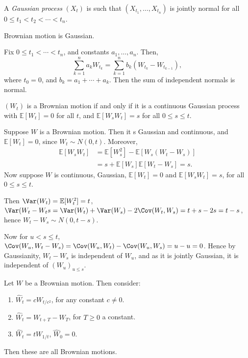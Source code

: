 \documentclass[12pt]{article}
\begin{document}
\begin{definition}
	A \emph{Gaussian process} $(X_t)$ is such that $(X_{t_1}, \ldots, X_{t_n})$ is jointly normal for all $0 \leq t_1 < t_2 < \cdots < t_n$.
\end{definition}

\begin{proposition}
	Brownian motion is Gaussian.
\end{proposition}

\begin{proofbox}
	Fix $0 \leq t_1 < \cdots < t_n$, and constants $a_1, \ldots, a_n$. Then,
	\[
	\sum_{k = 1}^n a_k W_{t_k} = \sum_{k = 1}^n b_k(W_{t_k} - W_{t_{k-1}}),
	\]
	where $t_0 = 0$, and $b_k = a_1 + \cdots + a_k$. Then the sum of independent normals is normal.
\end{proofbox}

\begin{proposition}
	$(W_t)$ is a Brownian motion if and only if it is a continuous Gaussian process with $\mathbb{E}[W_t] = 0$ for all $t$, and $\mathbb{E}[W_sW_t] = s$ for all $0 \leq s \leq t$.
\end{proposition}

\begin{proofbox}
	Suppose $W$ is a Brownian motion. Then it s Gaussian and continuous, and $\mathbb{E}[W_t] = 0$, since $W_t \sim N(0, t)$. Moreover,
	\begin{align*}
		\mathbb{E}[W_s W_t] &= \mathbb{E}[W_s^2] - \mathbb{E}[W_s(W_t - W_s)] \\
				    &= s + \mathbb{E}[W_s] \mathbb{E}[W_t - W_s] = s.
	\end{align*}
	Now suppose $W$ is continuous, Gaussian, $\mathbb{E}[W_t] = 0$ and $\mathbb{E}[W_s W_t] = s$, for all $0 \leq s \leq t$.
	
	Then $\Var(W_t) = \mathbb{E}[W_t^2] = t$, $\Var(W_t - W_ts = \Var(W_t) + \Var(W_s) - 2 \Cov(W_t, W_s) = t + s - 2s = t - s$, hence $W_t - W_s \sim N(0, t-s)$.

	Now for $u < s \leq t$, $\Cov(W_u, W_t - W_s) = \Cov(W_u, W_t) - \Cov(W_u, W_s) = u - u = 0$. Hence by Gaussianity, $W_t - W_s$ is independent of $W_u$, and as it is jointly Gaussian, it is independent of $(W_u)_{u \leq s}$.
\end{proofbox}

\begin{proposition}
	Let $W$ be a Brownian motion. Then consider:
	\begin{enumerate}[\normalfont(i)]
		\item $\hat W_t = c W_{t/c^2}$, for any constant $c \neq 0$.
		\item $\hat W_t = W_{t+T} - W_T$, for $T \geq 0$ a constant.
		\item $\hat W_t = t W_{1/t}$, $\hat W_0 = 0$.
	\end{enumerate}
	Then these are all Brownian motions.
\end{proposition}
\end{document}
